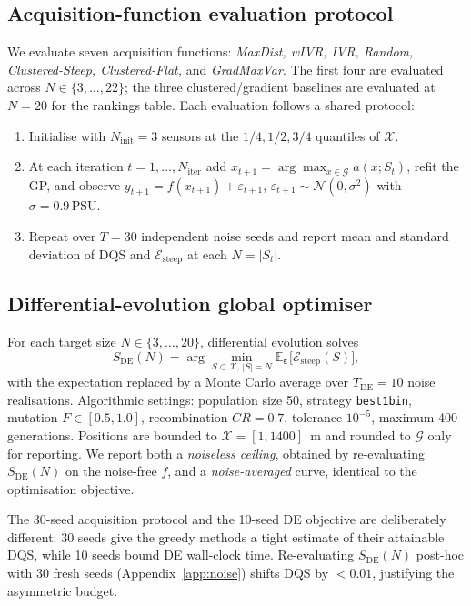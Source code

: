 \documentclass[11pt,letterpaper]{article}
\begin{document}
\subsection{Acquisition-function evaluation protocol}
\label{sec:acq-protocol}
We evaluate seven acquisition functions: \emph{MaxDist, wIVR, IVR,
Random, Clustered-Steep, Clustered-Flat,} and \emph{GradMaxVar}. The
first four are evaluated across $N\in\{3,\dots,22\}$; the three
clustered/gradient baselines are evaluated at $N=20$ for the rankings
table. Each evaluation follows a shared protocol:
\begin{enumerate}[itemsep=2pt,topsep=2pt]
  \item Initialise with $N_{\text{init}}=3$ sensors at the
        $1/4,1/2,3/4$ quantiles of $\mathcal{X}$.
  \item At each iteration $t=1,\dots,N_{\text{iter}}$ add
        $x_{t+1}=\arg\max_{x\in\mathcal{G}}a(x;S_{t})$, refit the GP,
        and observe $y_{t+1}=f(x_{t+1})+\varepsilon_{t+1}$,
        $\varepsilon_{t+1}\sim\mathcal{N}(0,\sigma^{2})$ with
        $\sigma=0.9\,\mathrm{PSU}$.
  \item Repeat over $T=30$ independent noise seeds and report mean and
        standard deviation of DQS and $\mathcal{E}_{\text{steep}}$ at
        each $N=|S_{t}|$.
\end{enumerate}

\subsection{Differential-evolution global optimiser}
\label{sec:de-protocol}
For each target size $N\in\{3,\dots,20\}$, differential evolution
solves
\begin{equation}
\label{eq:de-obj}
S_{\mathrm{DE}}(N)=\arg\min_{S\subset\mathcal{X},\,|S|=N}
\mathbb{E}_{\boldsymbol{\varepsilon}}
\bigl[\mathcal{E}_{\text{steep}}(S)\bigr],
\end{equation}
with the expectation replaced by a Monte Carlo average over
$T_{\mathrm{DE}}=10$ noise realisations. Algorithmic settings:
population size 50, strategy \texttt{best1bin}, mutation
$F\in[0.5,1.0]$, recombination $CR=0.7$, tolerance $10^{-5}$, maximum
400 generations. Positions are bounded to $\mathcal{X}=[1,1400]$~m and
rounded to $\mathcal{G}$ only for reporting. We report both a
\emph{noiseless ceiling}, obtained by re-evaluating $S_{\mathrm{DE}}(N)$
on the noise-free $f$, and a \emph{noise-averaged} curve, identical to
the optimisation objective.

The 30-seed acquisition protocol and the 10-seed DE objective are
deliberately different: 30 seeds give the greedy methods a tight
estimate of their attainable DQS, while 10 seeds bound DE wall-clock
time. Re-evaluating $S_{\mathrm{DE}}(N)$ post-hoc with 30 fresh seeds
(Appendix~\ref{app:noise}) shifts DQS by $<0.01$, justifying the
asymmetric budget.
\end{document}
